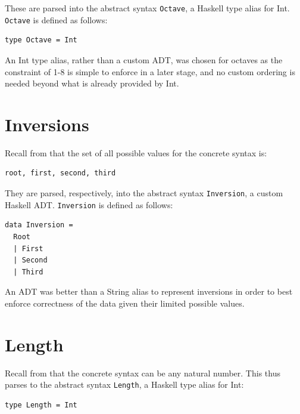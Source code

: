 \documentclass{report}
\newcommand\param[1]{\textttu{<#1>}}
\begin{document}
These are parsed into the abstract syntax \verb.Octave., a Haskell type alias for Int. \verb.Octave. is defined as follows:

\begin{verbatim}
type Octave = Int
\end{verbatim}

An Int type alias, rather than a custom ADT, was chosen for octaves as the constraint of  1-8 is simple to enforce in a later stage, and no custom ordering is needed beyond what is already provided by Int.
\section{Inversions}
Recall from  that the set of all possible values for the concrete syntax \param{INVERSION} is:
\begin{verbatim}
root, first, second, third
\end{verbatim}

They are parsed, respectively, into the abstract syntax \verb.Inversion., a custom Haskell ADT. \verb.Inversion. is defined as follows:

\begin{verbatim}
data Inversion = 
  Root 
  | First 
  | Second 
  | Third
\end{verbatim}

An ADT was better than a String alias to represent inversions in order to best enforce correctness of the data given their limited possible values. 

\section{Length}

Recall from  that the concrete syntax \param{LENGTH} can be any natural number. This thus parses to the abstract syntax \verb.Length., a Haskell type alias for Int:

\begin{verbatim}
type Length = Int
\end{verbatim}
 
\end{document}
